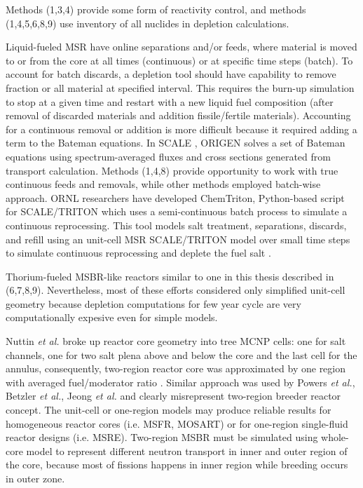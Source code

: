 Methods (1,3,4) provide some form of reactivity control, and methods (1,4,5,6,8,9) use inventory of all nuclides in depletion calculations. 

Liquid-fueled \gls{MSR} have online separations and/or feeds, where material is moved to or from the core at all times (continuous) or at specific time steps (batch). To account for batch discards, a depletion tool should have capability to remove fraction or all material at specified interval. This requires the burn-up simulation to stop at a given time and restart with a new liquid fuel composition (after removal of discarded materials and addition fissile/fertile materials). Accounting for a continuous removal or addition is more difficult because it required adding a term to the Bateman equations. In SCALE \cite{bowman_scale_2011}, ORIGEN \cite{gauld_isotopic_2011} solves a set of Bateman equations using spectrum-averaged fluxes and cross sections generated from transport calculation. Methods (1,4,8) provide opportunity to work with true continuous feeds and removals, while other methods employed batch-wise approach. \gls{ORNL} researchers have developed ChemTriton, Python-based script for SCALE/TRITON which uses a semi-continuous batch process to simulate a continuous reprocessing. This tool models salt treatment, separations, discards, and refill using an unit-cell \gls{MSR} SCALE/TRITON model over small time steps to simulate continuous reprocessing and deplete the fuel salt \cite{powers_new_2013}.

Thorium-fueled \gls{MSBR}-like reactors similar to one in this thesis described in (6,7,8,9). Nevertheless, most of these efforts considered only simplified unit-cell geometry because depletion computations for few year cycle are very computationally expesive even for simple models. 

Nuttin \emph{et al.} broke up reactor core geometry into tree \gls{MCNP} cells: one for salt channels, one for two salt plena above and below the core and the last cell for the annulus, consequently, two-region reactor core was approximated by one region with averaged fuel/moderator ratio \cite{nuttin_potential_2005}.  Similar approach was used by Powers \emph{et al.}, Betzler \emph{et al.}, Jeong \emph{et al.} \cite{powers_new_2013,powers_inventory_2014,betzler_modeling_2016, betzler_molten_2017, jeong_development_2014, jeong_equilibrium_2016} and clearly misrepresent two-region breeder reactor concept. The unit-cell or one-region models may produce reliable results for homogeneous reactor cores (i.e. \gls{MSFR}, \gls{MOSART}) or for one-region single-fluid reactor designs (i.e. \gls{MSRE}). Two-region \gls{MSBR} must be simulated using whole-core model to represent different neutron transport in inner and outer region of the core, because most of fissions happens in inner region while breeding occurs in outer zone.  

